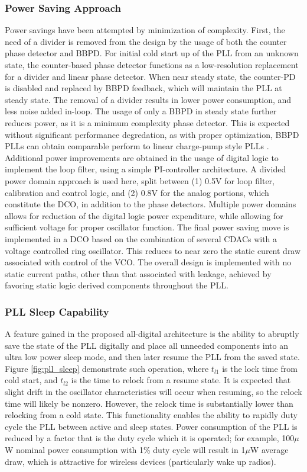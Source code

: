 	\subsubsection{Power Saving Approach}
	Power savings have been attempted by minimization of complexity. First, the need of a divider is removed from the design by the usage of both the counter phase detector and BBPD. For initial cold start up of the PLL from an unknown state, the counter-based phase detector functions as a low-resolution replacement for a divider and linear phase detector. When near steady state, the counter-PD is disabled and replaced by BBPD feedback, which will maintain the PLL at steady state. The removal of a divider results in lower power consumption, and less noise added in-loop. The usage of only a BBPD in steady state further reduces power, as it is a minimum complexity phase detector. This is expected without significant performance degredation, as with proper optimization, BBPD PLLs can obtain comparable perform to linear charge-pump style PLLs \cite{xu_abidi_2017}. Additional power improvements are obtained in the usage of digital logic to implement the loop filter, using a simple PI-controller architecture. A divided power domain approach is used here, split between (1) 0.5V for loop filter, calibration and control logic, and (2) 0.8V for the analog portions, which constitute the DCO, in addition to the phase detectors. Multiple power domains allows for reduction of the digital logic power expenditure, while allowing for sufficient voltage for proper oscillator function. The final power saving move is implemented in a DCO based on the combination of several CDACs with a voltage controlled ring oscillator. This reduces to near zero the static curent draw associated with control of the VCO. The overall design is implemented with no static current paths, other than that associated with leakage, achieved by favoring static logic derived components throughout the PLL.

	\subsubsection{PLL Sleep Capability}
	A feature gained in the proposed all-digital architecture is the ability to abruptly save the state of the PLL digitally and place all unneeded components into an ultra low power sleep mode, and then later resume the PLL from the saved state. Figure \ref{fig:pll_sleep} demonstrate such operation, where $t_{l1}$ is the lock time from cold start, and $t_{l2}$ is the time to relock from a resume state. It is expected that slight drift in the oscillator characteristics will occur when resuming, so the relock time will likely be nonzero. However, the relock time is substantially lower than relocking from a cold state. This functionality enables the ability to rapidly duty cycle the PLL between active and sleep states. Power consumption of the PLL is reduced by a factor that is the duty cycle which it is operated; for example, 100$\mu$W nominal power consumption with 1\% duty cycle will result in 1$\mu$W average draw, which is attractive for wireless devices (particularly wake up radios).

